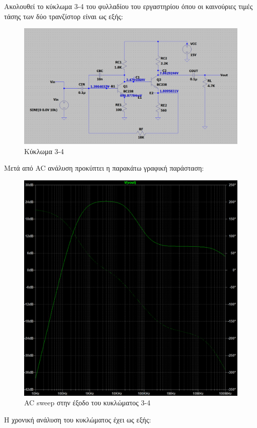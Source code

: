 \documentclass[11pt,a4paper,twoside,onecolumn,openright,final]{memoir}
\begin{document}
Ακολουθεί το κύκλωμα 3-4 του φυλλαδίου του εργαστηρίου όπου οι καινούριες τιμές τάσης των δύο τρανζίστορ είναι ως εξής:
\begin{figure}[H]
\centerfloat
\includegraphics[width=12.0cm]{figures/exercise3circuit4.png}
\caption{Κύκλωμα 3-4}
\label{fig:ex3circuit4}
\end{figure}
Μετά από AC ανάλυση προκύπτει η παρακάτω γραφική παράσταση:
\begin{figure}[H]
\centerfloat
\includegraphics[width=12.0cm]{figures/exercise3_4plot.png}
\caption{AC sweep στην έξοδο του κυκλώματος 3-4}
\label{fig:ex3plot4}
\end{figure}
Η χρονική ανάλυση του κυκλώματος έχει ως εξής: 
\end{document}
